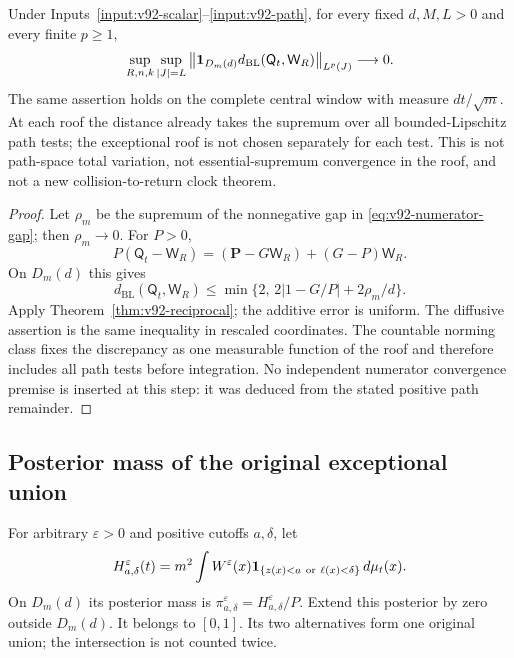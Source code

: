 \begin{theorem}
\label{thm:v92-kernels}
Under Inputs~\ref{input:v92-scalar}--\ref{input:v92-path}, for every
fixed $d,M,L>0$ and every finite $p\ge1$,
\begin{equation}\label{eq:v92-kernel-local}
 \sup_{R,n,k}\sup_{|J|=L}
 \left\|\one_{D_m(d)}
 d_{\mathrm{BL}}(\mathsf Q_t,\mathsf W_R)\right\|_{L^p(J)}
                                                    \longrightarrow0.
\end{equation}
The same assertion holds on the complete central window with measure
$dt/\sqrt m$. At each roof the distance already takes the supremum
over all bounded-Lipschitz path tests; the exceptional roof is not
chosen separately for each test. This is not path-space total variation,
not essential-supremum convergence in the roof, and not a new
collision-to-return clock theorem.
\end{theorem}
\begin{proof}
Let $\rho_m$ be the supremum of the nonnegative gap in
\eqref{eq:v92-numerator-gap}; then $\rho_m\to0$. For $P>0$,
\[
 P(\mathsf Q_t-\mathsf W_R)
   =(\mathbf P-G\mathsf W_R)+(G-P)\mathsf W_R.
\]
On $D_m(d)$ this gives
\begin{equation}\label{eq:v92-kernel-pointwise}
 d_{\mathrm{BL}}(\mathsf Q_t,\mathsf W_R)
       \le\min\{2,\,2|1-G/P|+2\rho_m/d\}.
\end{equation}
Apply Theorem~\ref{thm:v92-reciprocal}; the additive error is uniform.
The diffusive assertion is the same inequality in rescaled coordinates.
The countable norming class fixes the discrepancy as one measurable
function of the roof and therefore includes all path tests before
integration. No independent numerator convergence premise is inserted
at this step: it was deduced from the stated positive path remainder.
\end{proof}

\subsection{Posterior mass of the original exceptional union}
For arbitrary $\varepsilon>0$ and positive cutoffs $a,\delta$, let
\[
 H_{a,\delta}^\varepsilon(t)
   =m^2\int W^\varepsilon(x)
          \one_{\{z(x)<a\ \mathrm{or}\ \ell(x)<\delta\}}\,d\mu_t(x).
\]
On $D_m(d)$ its posterior mass is
$\pi_{a,\delta}^\varepsilon=H_{a,\delta}^\varepsilon/P$.
Extend this posterior by zero outside $D_m(d)$. It belongs to $[0,1]$.
Its two alternatives form one original union;
the intersection is not counted twice.

